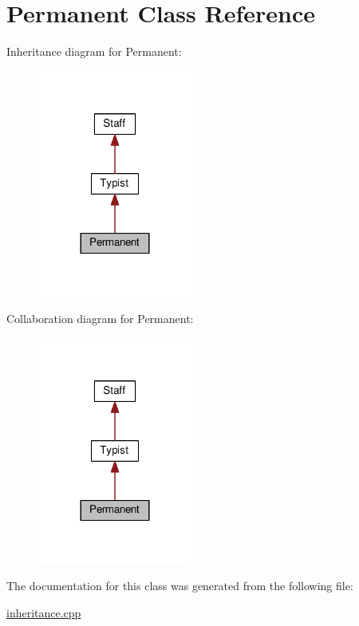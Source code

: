 \hypertarget{class_permanent}{}\section{Permanent Class Reference}
\label{class_permanent}


Inheritance diagram for Permanent\+:
\nopagebreak
\begin{figure}[H]
\begin{center}
\leavevmode
\includegraphics[width=144pt]{class_permanent__inherit__graph}
\end{center}
\end{figure}


Collaboration diagram for Permanent\+:
\nopagebreak
\begin{figure}[H]
\begin{center}
\leavevmode
\includegraphics[width=144pt]{class_permanent__coll__graph}
\end{center}
\end{figure}


The documentation for this class was generated from the following file\+:\begin{DoxyCompactItemize}
\item 
\hyperlink{inheritance_8cpp}{inheritance.\+cpp}\end{DoxyCompactItemize}
